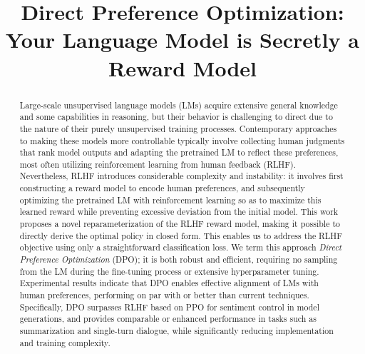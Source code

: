 \title{Direct Preference Optimization: Your Language Model is Secretly a Reward Model}

\begin{abstract}
Large-scale unsupervised language models (LMs) acquire extensive general knowledge and some capabilities in reasoning, but their behavior is challenging to direct due to the nature of their purely unsupervised training processes. Contemporary approaches to making these models more controllable typically involve collecting human judgments that rank model outputs and adapting the pretrained LM to reflect these preferences, most often utilizing reinforcement learning from human feedback (RLHF). Nevertheless, RLHF introduces considerable complexity and instability: it involves first constructing a reward model to encode human preferences, and subsequently optimizing the pretrained LM with reinforcement learning so as to maximize this learned reward while preventing excessive deviation from the initial model. This work proposes a novel reparameterization of the RLHF reward model, making it possible to directly derive the optimal policy in closed form. This enables us to address the RLHF objective using only a straightforward classification loss. We term this approach \textit{Direct Preference Optimization} (DPO); it is both robust and efficient, requiring no sampling from the LM during the fine-tuning process or extensive hyperparameter tuning. Experimental results indicate that DPO enables effective alignment of LMs with human preferences, performing on par with or better than current techniques. Specifically, DPO surpasses RLHF based on PPO for sentiment control in model generations, and provides comparable or enhanced performance in tasks such as summarization and single-turn dialogue, while significantly reducing implementation and training complexity.
\end{abstract}

